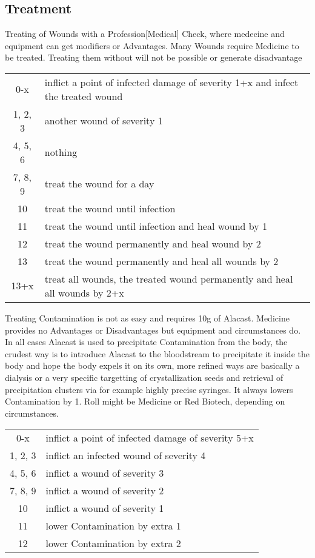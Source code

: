 \subsection{Treatment}
Treating of Wounds with a Profession[Medical] Check, where medecine and equipment can get modifiers or Advantages.
Many Wounds require Medicine to be treated.
Treating them without will not be possible or generate disadvantage\vspace{1.5cm}
\begin{tabular}{cl}
    0-x & inflict a point of infected damage of severity 1+x and infect the treated wound\\
    1, 2, 3 & another wound of severity 1\\
    4, 5, 6 & nothing\\
    7, 8, 9 & treat the wound for a day\\
    10 & treat the wound until infection \\
    11 & treat the wound until infection and heal wound by 1 \\
    12 & treat the wound permanently and heal wound by 2 \\
    13 & treat the wound permanently and heal all wounds by 2\\
    13+x & treat all wounds, the treated wound permanently and heal all wounds by 2+x\\
\end{tabular}\vspace{1.5cm}
Treating Contamination is not as easy and requires 10g of Alacast.
Medicine provides no Advantages or Disadvantages
but equipment and circumstances do.
In all cases Alacast is used to precipitate Contamination from the body, the
crudest way is to introduce Alacast to the bloodstream to precipitate it inside the body and hope the body expels
it on its own, more refined ways are basically a dialysis or a very specific targetting of crystallization seeds
and retrieval of precipitation clusters via for example highly precise syringes.
It always lowers Contamination by 1.
Roll might be Medicine or Red Biotech, depending on circumstances.
\begin{tabular}{cl}
    0-x & inflict a point of infected damage of severity 5+x \\
    1, 2, 3 & inflict an infected wound of severity 4 \\
    4, 5, 6 & inflict a wound of severity 3\\
    7, 8, 9 & inflict a wound of severity 2\\
    10 & inflict a wound of severity 1\\
    11 & lower Contamination by extra 1 \\
    12 & lower Contamination by extra 2 \\
\end{tabular}\vspace{1.5cm}
